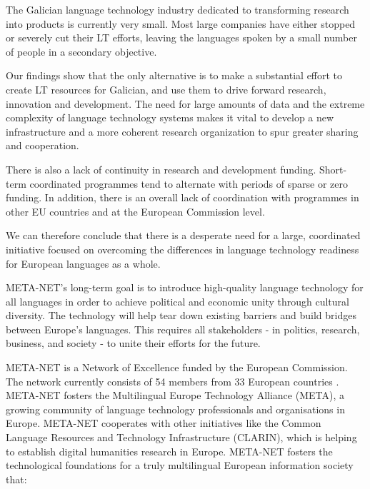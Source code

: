 \begin{multicols}{2}
\begin{itemize}
\begin{multicols}{2}
    The Galician language technology industry dedicated to transforming research into products is currently very small. Most large companies have either stopped or severely cut their LT efforts, leaving the languages spoken by a small number of people in a secondary objective.

    Our findings show that the only alternative is to make a substantial effort to create LT resources for Galician, and use them to drive forward research, innovation and development. The need for large amounts of data and the extreme complexity of language technology systems makes it vital to develop a new infrastructure and a more coherent research organization to spur greater sharing and cooperation.

    There is also a lack of continuity in research and development funding. Short-term coordinated programmes tend to alternate with periods of sparse or zero funding. In addition, there is an overall lack of coordination with programmes in other EU countries and at the European Commission level.

    We can therefore conclude that there is a desperate need for a large, coordinated initiative focused on overcoming the differences in language technology readiness for European languages as a whole.

    META-NET’s long-term goal is to introduce high-quality language technology for all languages in order to achieve political and economic unity through cultural diversity. The technology will help tear down existing barriers and build bridges between Europe’s languages. This requires all stakeholders - in politics, research, business, and society - to unite their efforts for the future.
\end{multicols}

\clearpage



\begin{multicols}{2}
META-NET is a Network of Excellence funded by the European Commission. The network currently consists of 54 members from 33 European countries \cite{rehm2011}. META-NET fosters the Multilingual Europe Technology Alliance (META), a growing community of language technology professionals and organisations in Europe. META-NET cooperates with other initiatives like the Common Language Resources and Technology Infrastructure (CLARIN), which is helping to establish digital humanities research in Europe. META-NET fosters the technological foundations for a truly multilingual European information society that:


\end{multicols}
\end{itemize}
\end{multicols}
